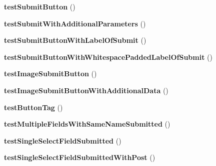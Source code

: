 \begin{DoxyCompactItemize}
\item 
\hypertarget{class_test_of_form_a45dbb8474c8fbd8c5fde2fae1b83d733}{
{\bfseries testSubmitButton} ()}
\label{class_test_of_form_a45dbb8474c8fbd8c5fde2fae1b83d733}

\item 
\hypertarget{class_test_of_form_a2d77f83d2adfc561c99b22f960033553}{
{\bfseries testSubmitWithAdditionalParameters} ()}
\label{class_test_of_form_a2d77f83d2adfc561c99b22f960033553}

\item 
\hypertarget{class_test_of_form_a8ffe64aea909c6678ee4312e8ee712b0}{
{\bfseries testSubmitButtonWithLabelOfSubmit} ()}
\label{class_test_of_form_a8ffe64aea909c6678ee4312e8ee712b0}

\item 
\hypertarget{class_test_of_form_ab7e86cc78297a6bca37451d08d059785}{
{\bfseries testSubmitButtonWithWhitespacePaddedLabelOfSubmit} ()}
\label{class_test_of_form_ab7e86cc78297a6bca37451d08d059785}

\item 
\hypertarget{class_test_of_form_ab25a5cb592732116fe503bc7c0aca79b}{
{\bfseries testImageSubmitButton} ()}
\label{class_test_of_form_ab25a5cb592732116fe503bc7c0aca79b}

\item 
\hypertarget{class_test_of_form_ab92af5b20f9af12103c1ced5c142f665}{
{\bfseries testImageSubmitButtonWithAdditionalData} ()}
\label{class_test_of_form_ab92af5b20f9af12103c1ced5c142f665}

\item 
\hypertarget{class_test_of_form_ae96d8d1b761ffbfc73b3d4662029151d}{
{\bfseries testButtonTag} ()}
\label{class_test_of_form_ae96d8d1b761ffbfc73b3d4662029151d}

\item 
\hypertarget{class_test_of_form_a29ece1ca094a1236997e1a9c6584956e}{
{\bfseries testMultipleFieldsWithSameNameSubmitted} ()}
\label{class_test_of_form_a29ece1ca094a1236997e1a9c6584956e}

\item 
\hypertarget{class_test_of_form_ab6213b4cfc8d30508bba962852dd8dbe}{
{\bfseries testSingleSelectFieldSubmitted} ()}
\label{class_test_of_form_ab6213b4cfc8d30508bba962852dd8dbe}

\item 
\hypertarget{class_test_of_form_a8533ead61ff30093655e74d29beaf0eb}{
{\bfseries testSingleSelectFieldSubmittedWithPost} ()}
\label{class_test_of_form_a8533ead61ff30093655e74d29beaf0eb}


\end{DoxyCompactItemize}
